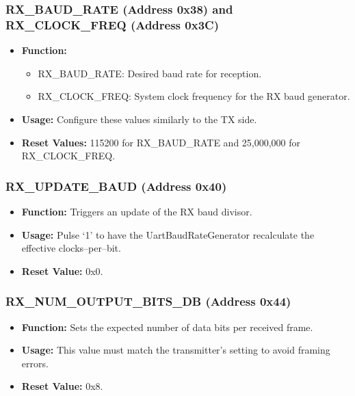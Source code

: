 \subsubsection{RX\_BAUD\_RATE (Address 0x38) and RX\_CLOCK\_FREQ (Address 0x3C)}
\begin{itemize}[noitemsep]
    \item \textbf{Function:}
    \begin{itemize}
        \item RX\_BAUD\_RATE: Desired baud rate for reception.
        \item RX\_CLOCK\_FREQ: System clock frequency for the RX baud generator.
    \end{itemize}
    \item \textbf{Usage:} Configure these values similarly to the TX side.
    \item \textbf{Reset Values:} 115200 for RX\_BAUD\_RATE and 25,000,000 for RX\_CLOCK\_FREQ.
\end{itemize}

\subsubsection{RX\_UPDATE\_BAUD (Address 0x40)}
\begin{itemize}[noitemsep]
    \item \textbf{Function:} Triggers an update of the RX baud divisor.
    \item \textbf{Usage:} Pulse ‘1’ to have the UartBaudRateGenerator recalculate the effective clocks–per–bit.
    \item \textbf{Reset Value:} 0x0.
\end{itemize}

\subsubsection{RX\_NUM\_OUTPUT\_BITS\_DB (Address 0x44)}
\begin{itemize}[noitemsep]
    \item \textbf{Function:} Sets the expected number of data bits per received frame.
    \item \textbf{Usage:} This value must match the transmitter’s setting to avoid framing errors.
    \item \textbf{Reset Value:} 0x8.
\end{itemize}

